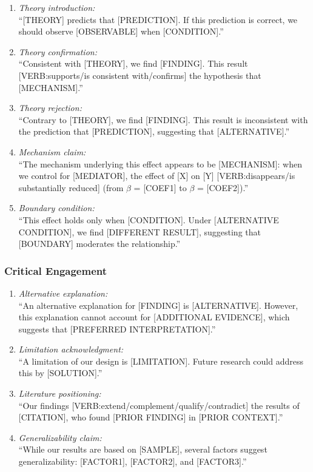 \begin{enumerate}[label=\textbf{T\arabic*.}, leftmargin=2.5cm]
\item \textit{Theory introduction:} \\
``[THEORY] predicts that [PREDICTION]. If this prediction is correct,
we should observe [OBSERVABLE] when [CONDITION].''

\item \textit{Theory confirmation:} \\
``Consistent with [THEORY], we find [FINDING]. This result
[VERB:supports/is consistent with/confirms] the hypothesis that [MECHANISM].''

\item \textit{Theory rejection:} \\
``Contrary to [THEORY], we find [FINDING]. This result is inconsistent
with the prediction that [PREDICTION], suggesting that [ALTERNATIVE].''

\item \textit{Mechanism claim:} \\
``The mechanism underlying this effect appears to be [MECHANISM]:
when we control for [MEDIATOR], the effect of [X] on [Y]
[VERB:disappears/is substantially reduced] (from $\beta$ = [COEF1]
to $\beta$ = [COEF2]).''

\item \textit{Boundary condition:} \\
``This effect holds only when [CONDITION]. Under [ALTERNATIVE CONDITION],
we find [DIFFERENT RESULT], suggesting that [BOUNDARY] moderates
the relationship.''
\end{enumerate}

\subsubsection{Critical Engagement}

\begin{enumerate}[label=\textbf{C\arabic*.}, leftmargin=2.5cm]
\item \textit{Alternative explanation:} \\
``An alternative explanation for [FINDING] is [ALTERNATIVE]. However,
this explanation cannot account for [ADDITIONAL EVIDENCE], which
suggests that [PREFERRED INTERPRETATION].''

\item \textit{Limitation acknowledgment:} \\
``A limitation of our design is [LIMITATION]. Future research could
address this by [SOLUTION].''

\item \textit{Literature positioning:} \\
``Our findings [VERB:extend/complement/qualify/contradict] the results
of [CITATION], who found [PRIOR FINDING] in [PRIOR CONTEXT].''

\item \textit{Generalizability claim:} \\
``While our results are based on [SAMPLE], several factors suggest
generalizability: [FACTOR1], [FACTOR2], and [FACTOR3].''
\end{enumerate}

